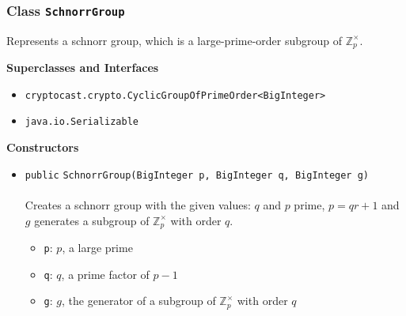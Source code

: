 \subsubsection{Class \lstinline|SchnorrGroup|}
Represents a schnorr group, which is a large-prime-order subgroup of
 $\mathbb{Z}_p^\times$. \\
\noindent\begin{minipage}[t]{5cm}
\vspace{0.3em}
\hspace*{2em}
\vspace{0.3em}
\end{minipage}



\textbf{\sffamily Superclasses and Interfaces}
\begin{itemize}
\item \lstinline|cryptocast.crypto.CyclicGroupOfPrimeOrder<BigInteger>|
\item \lstinline|java.io.Serializable|
\end{itemize}


\textbf{\sffamily Constructors}
\begin{itemize}
\item \lstinline|public| \lstinline|SchnorrGroup|\lstinline|(BigInteger p, BigInteger q, BigInteger g)|\\ \\[-0.6em]
Creates a schnorr group with the given values:
 $q$ and $p$ prime, $p = qr + 1$ and $g$ generates
 a subgroup of $\mathbb{Z}_p^\times$ with order $q$.
\begin{itemize}
\item \lstinline|p|: $p$, a large prime
\item \lstinline|q|: $q$, a prime factor of $p - 1$
\item \lstinline|g|: $g$, the generator of a subgroup of $\mathbb{Z}_p^\times$
          with order $q$
\end{itemize}



\end{itemize}


